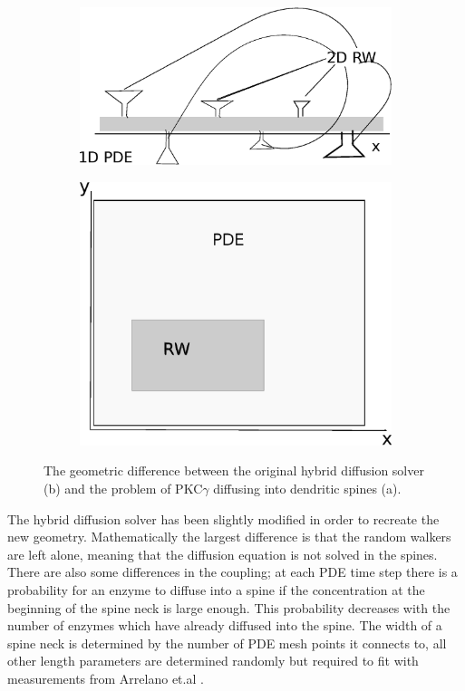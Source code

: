 \begin{figure}[H]
 \centering
 \begin{subfigure}{0.48\textwidth}
  \includegraphics[width=\textwidth]{Figures/dendrite_spine_model.eps}
  \caption{}
 \end{subfigure}
 \begin{subfigure}{0.48\textwidth}
  \includegraphics[width=\textwidth]{Figures/hybrid_model_principle.eps}
  \caption{}
 \end{subfigure}
 \caption[Difference between hybrid diffusion solver and dendrite - spine diffusion model]{The geometric difference between the original hybrid diffusion solver (b) and the problem of PKC$\gamma$ diffusing into dendritic spines (a). }
 \label{application:geometry_difference}
\end{figure}

The hybrid diffusion solver has been slightly modified in order to recreate the new geometry. 
Mathematically the largest difference is that the random walkers are left alone, meaning that the diffusion equation is not solved in the spines. 
There are also some differences in the coupling; at each PDE time step there is a probability for an enzyme to diffuse into a spine if the concentration at the beginning of the spine neck is large enough. This probability decreases with the number of enzymes which have already diffused into the spine. 
The width of a spine neck is determined by the number of PDE mesh points it connects to, all other length parameters are determined randomly but required to fit with measurements from Arrelano et.al \cite{arellano2007ultrastructure}. 


